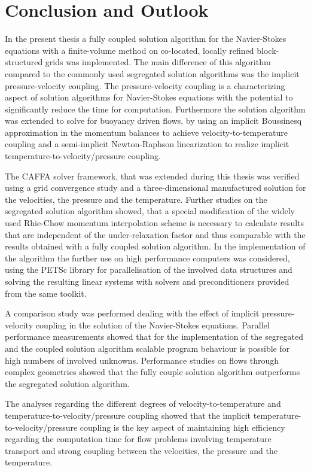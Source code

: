 \section{Conclusion and Outlook}
\label{sec:conclusion}

In the present thesis a fully coupled solution algorithm for the Navier-Stokes equations with a finite-volume method on co-located, locally refined block-structured grids was implemented. The main difference of this algorithm compared to the commonly used segregated solution algorithms was the implicit pressure-velocity coupling. The pressure-velocity coupling is a characterizing aspect of solution algorithms for Navier-Stokes equations with the potential to significantly reduce the time for computation. Furthermore the solution algorithm was extended to solve for buoyancy driven flows, by using an implicit Boussinesq approximation in the momentum balances to achieve velocity-to-temperature coupling and a semi-implicit Newton-Raphson linearization to realize implicit temperature-to-velocity/pressure coupling.

The CAFFA solver framework, that was extended during this thesis was verified using a grid convergence study and a three-dimensional manufactured solution for the velocities, the pressure and the temperature. Further studies on the segregated solution algorithm showed, that a special modification of the widely used Rhie-Chow momentum interpolation scheme is necessary to calculate results that are independent of the under-relaxation factor and thus comparable with the results obtained with a fully coupled solution algorithm. In the implementation of the algorithm the further use on high performance computers was considered, using the PETSc library for parallelisation of the involved data structures and solving the resulting linear systems with solvers and preconditioners provided from the same toolkit.

A comparison study was performed dealing with the effect of implicit pressure-velocity coupling in the solution of the Navier-Stokes equations. Parallel performance measurements showed that for the implementation of the segregated and the coupled solution algorithm scalable program behaviour is possible for high numbers of involved unknowns. Performance studies on flows through complex geometries showed that the fully couple solution algorithm outperforms the segregated solution algorithm. 

The analyses regarding the different degrees of velocity-to-temperature and temperature-to-velocity/pressure coupling showed that the implicit temperature-to-velocity/pressure coupling is the key aspect of maintaining high efficiency regarding the computation time for flow problems involving temperature transport and strong coupling between the velocities, the pressure and the temperature.

